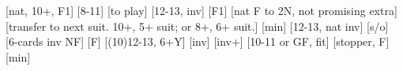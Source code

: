 \begin{bidsemi}
[nat, 10+, F1]
    [8-11]
        [to play]
    [12-13, inv]
    [F1]
    [nat F to 2N, not promising extra]
[transfer to next suit. 10+, 5+ suit; or 8+, 6+ suit.]
    [min]
        [12-13, nat inv]
        [s/o]
        [6-cards inv NF]
        [F]
    [(10)12-13, 6+Y]
    [inv]
    [inv+]
[10-11 or GF, fit]
    [stopper, F]
    [min]
\end{bidsemi}